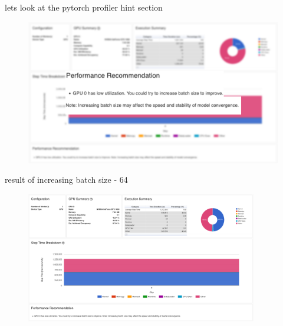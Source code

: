 \documentclass[compress,aspectratio=169]{beamer}
\begin{document}
\begin{frame}{lets look at the pytorch profiler hint section}

\begin{center}
    \begin{figure}
        \includegraphics[width=1\textwidth]{../../data/scap_gtx1080_profiler-torch_14615562_zoom}
    \end{figure}
\end{center}

\end{frame}

\begin{frame}{result of increasing batch size - 64}
	\vspace{-1em}
\begin{center}
    \begin{figure}
        \includegraphics[width=0.9\textwidth]{../../data/scap_gtx1080_profiler-torch_batch-size-64_14629008}
    \end{figure}
    \end{center}

\end{frame}
\end{document}
